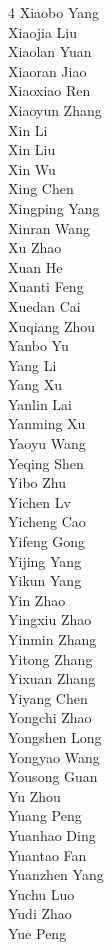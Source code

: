 \begin{multicols}{4}
Xiaobo Yang \\
Xiaojia Liu \\
Xiaolan Yuan \\
Xiaoran Jiao \\
Xiaoxiao Ren \\
Xiaoyun Zhang \\
Xin Li \\
Xin Liu \\
Xin Wu \\
Xing Chen \\
Xingping Yang \\
Xinran Wang \\
Xu Zhao \\
Xuan He \\
Xuanti Feng \\
Xuedan Cai \\
Xuqiang Zhou \\
Yanbo Yu \\
Yang Li \\
Yang Xu \\
Yanlin Lai \\
Yanming Xu \\
Yaoyu Wang \\
Yeqing Shen \\
Yibo Zhu \\
Yichen Lv \\
Yicheng Cao \\
Yifeng Gong \\
Yijing Yang \\
Yikun Yang \\
Yin Zhao \\
Yingxiu Zhao \\
Yinmin Zhang \\
Yitong Zhang \\
Yixuan Zhang \\
Yiyang Chen \\
Yongchi Zhao \\
Yongshen Long \\
Yongyao Wang \\
Yousong Guan \\
Yu Zhou \\
Yuang Peng \\
Yuanhao Ding \\
Yuantao Fan \\
Yuanzhen Yang \\
Yuchu Luo \\
Yudi Zhao \\
Yue Peng \\

\end{multicols}

